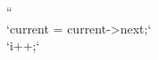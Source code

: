 \documentclass[preview]{standalone}
\begin{document}
``\\`current = current->next;`\\`i++;`\\
\end{document}
